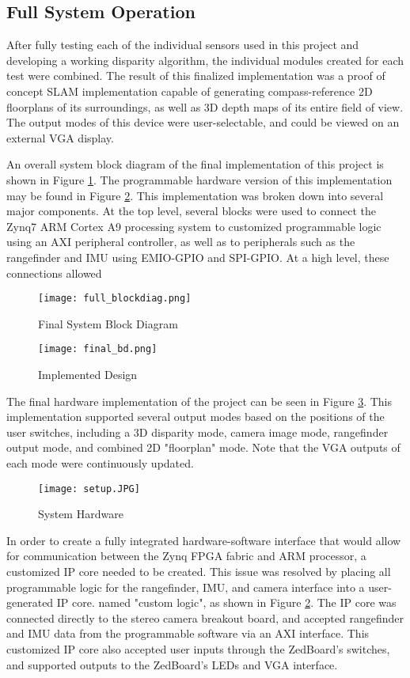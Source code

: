 \subsection{Full System Operation}
After fully testing each of the individual sensors used in this project and developing a working disparity algorithm, the individual modules created for each test were combined. The result of this finalized implementation was a proof of concept SLAM implementation capable of generating compass-reference 2D floorplans of its surroundings, as well as 3D depth maps of its entire field of view. The output modes of this device were user-selectable, and could be viewed on an external VGA display.
\par
An overall system block diagram of the final implementation of this project is shown in Figure \ref{systemBD2}. The programmable hardware version of this implementation may be found in Figure \ref{finalBD}. This implementation was broken down into several major components. At the top level, several blocks were used to connect the Zynq7 ARM Cortex A9 processing system to customized programmable logic using an AXI peripheral controller, as well as to peripherals such as the rangefinder and IMU using EMIO-GPIO and SPI-GPIO. At a high level, these connections allowed 
\par
\begin{figure}[H] 
	\centerline{
	\texttt{[image: full\_blockdiag.png]}
	}
	\caption{Final System Block Diagram}
	\label{systemBD2}
\end{figure}
\par
\begin{figure}[!htb] 
	\centerline{
	\texttt{[image: final\_bd.png]}
	}
	\caption{Implemented Design}
	\label{finalBD}
\end{figure}
\par
The final hardware implementation of the project can be seen in Figure 
\ref{finalHW}. This implementation supported several output modes based on the positions of the user switches, including a 3D disparity mode, camera image mode, rangefinder output mode, and combined 2D "floorplan" mode. Note that the VGA outputs of each mode were continuously updated. 
\begin{figure}[H]  
 	\centerline{
	\texttt{[image: setup.JPG]}
	}
	\caption{System Hardware}
	\label{finalHW}
\end{figure}
\par
In order to create a fully integrated hardware-software interface that would allow for communication between the Zynq FPGA fabric and ARM processor, a customized IP core needed to be created. This issue was resolved by placing all programmable logic for the rangefinder, IMU, and camera interface into a user-generated IP core. named "custom logic", as shown in Figure \ref{finalBD}. The IP core was connected directly to the stereo camera breakout board, and accepted rangefinder and IMU data from the programmable software via an AXI interface. This customized IP core also accepted user inputs through the ZedBoard's switches, and supported outputs to the ZedBoard's LEDs and VGA interface. 
